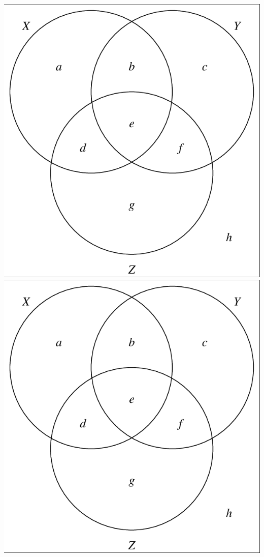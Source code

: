 \begin{center}
\includegraphics[scale=0.3]{img/Venn-diagram-visualization-of-a-3-event-probability-space-O.png}
\includegraphics[scale=0.3]{img/Venn-diagram-visualization-of-a-3-event-probability-space-O.png}

\end{center}
